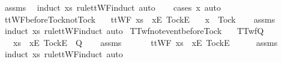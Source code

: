 \ assms\ \isamarkupfalse%
\ {\isacharparenleft}induct\ xs\ rule{\isacharcolon}ttWF{\isachardot}induct{\isacharcomma}\ auto{\isacharparenright}\isanewline
\ \ \isamarkupfalse%
\ {\isacharparenleft}cases\ x{\isacharcomma}\ auto{\isacharparenright}%
\endisatagproof
{\isafoldproof}%
%
\isadelimproof
\isanewline
%
\endisadelimproof
\isanewline
{}\isamarkupfalse%
\ ttWF{\isacharunderscore}before{\isacharunderscore}Tock{\isacharunderscore}not{\isacharunderscore}Tock{\isacharcolon}\isanewline
\ \ \ {\isachardoublequoteopen}ttWF\ {\isacharparenleft}xs\ {\isacharat}\ {\isacharbrackleft}{\isacharbrackleft}x{}{\isacharbrackright}\isactrlsub E{\isacharcomma}\ {\isacharbrackleft}Tock{\isacharbrackright}\isactrlsub E{\isacharbrackright}{\isacharparenright}{\isachardoublequoteclose}\isanewline
\ \ \ {\isachardoublequoteopen}x{}\ {\isasymnoteq}\ Tock{\isachardoublequoteclose}\isanewline
%
\isadelimproof
\ \ %
\endisadelimproof
%
\isatagproof
{}\isamarkupfalse%
\ assms\ \isamarkupfalse%
\ {\isacharparenleft}induct\ xs\ rule{\isacharcolon}ttWF{\isachardot}induct{\isacharcomma}\ auto{\isacharparenright}%
\endisatagproof
{\isafoldproof}%
%
\isadelimproof
\isanewline
%
\endisadelimproof
\isanewline
{}\isamarkupfalse%
\ TTwf{\isacharunderscore}not{\isacharunderscore}event{\isacharunderscore}before{\isacharunderscore}Tock{\isacharcolon}\isanewline
\ \ \ {\isachardoublequoteopen}TTwf{\isacharparenleft}Q{\isacharparenright}{\isachardoublequoteclose}\isanewline
\ \ \ {\isachardoublequoteopen}xs\ {\isacharat}\ {\isacharbrackleft}{\isacharbrackleft}x{}{\isacharbrackright}\isactrlsub E{\isacharcomma}\ {\isacharbrackleft}Tock{\isacharbrackright}\isactrlsub E{\isacharbrackright}\ {\isasymnotin}\ Q{\isachardoublequoteclose}\isanewline
%
\isadelimproof
\ \ %
\endisadelimproof
%
\isatagproof
{}\isamarkupfalse%
\ assms\isanewline
{}\isamarkupfalse%
\ {\isacharminus}\isanewline
\ \ \isamarkupfalse%
\ {\isachardoublequoteopen}{\isasymnot}\ ttWF\ {\isacharparenleft}xs\ {\isacharat}\ {\isacharbrackleft}{\isacharbrackleft}x{}{\isacharbrackright}\isactrlsub E{\isacharcomma}\ {\isacharbrackleft}Tock{\isacharbrackright}\isactrlsub E{\isacharbrackright}{\isacharparenright}{\isachardoublequoteclose}\isanewline
\ \ \ \ \isamarkupfalse%
\ assms\ \isamarkupfalse%
\ {\isacharparenleft}induct\ xs\ rule{\isacharcolon}ttWF{\isachardot}induct{\isacharcomma}\ auto{\isacharparenright}\isanewline
